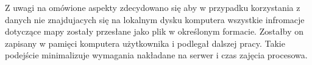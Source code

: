 Z uwagi na omówione aspekty zdecydowano się aby w przypadku korzystania z danych nie znajdujacych się na lokalnym dysku komputera wszystkie infromacje dotyczące mapy zostały przesłane jako plik w określonym formacie. Zostałby on zapisany w pamięci komputera użytkownika i podlegał dalszej pracy. Takie podejście minimalizuje wymagania nakładane na serwer i czas zajęcia procesowa.

\newpage
